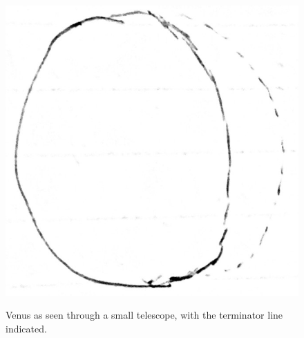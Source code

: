 \documentclass[11pt]{article}
\begin{document}
\begin{figure}[H]
\caption{Venus as seen through a small telescope, with the terminator line indicated.}
\begin{center}
\includegraphics[scale=0.5]{figures/venus.jpg}
\label{fig:venus}
\end{center}
\end{figure}
\end{document}

